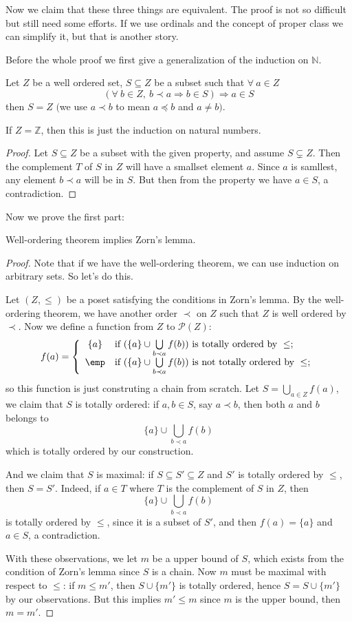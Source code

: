 Now we claim that these three things are equivalent. The proof is not so difficult but still need some efforts. If we use ordinals and the concept of proper class we can simplify it, but that is another story.\par
Before the whole proof we first give a generalization of the induction on $\mathbb{N}$.
\begin{theorem}
Let $Z$ be a well ordered set, $S\subseteq Z$ be a subset such that $\forall\ a\in Z$
\[(\forall\ b\in Z,\ b\prec a\Rightarrow b\in S)\Rightarrow a\in S\]
then $S=Z$ $($we use $a\prec b$ to mean $a\preceq b$ and $a\neq b$$)$.
\end{theorem}
If $Z=\mathbb{Z}$, then this is just the induction on natural numbers.
\begin{proof}
	Let $S\subseteq Z$ be a subset with the given property, and assume $S\subsetneq Z$. Then the complement $T$ of $S$ in $Z$ will have a smallset element $a$. Since $a$ is samllest, any element $b\prec a$ will be in $S$. But then from the property we have $a\in S$, a contradiction.
\end{proof}
Now we prove the first part:
\begin{theorem}
	Well-ordering theorem implies Zorn's lemma.
\end{theorem}
\begin{proof}
Note that if we have the well-ordering theorem, we can use induction on arbitrary sets. So let's do this.\par
Let $(Z,\leq)$ be a poset satisfying the conditions in Zorn's lemma. By the well-ordering theorem, we have another order $\prec$ on $Z$ such that $Z$ is well ordered by $\prec$. Now we define a function from $Z$ to $\mathscr{P}(Z)$:
\[f(a)=\left\{\begin{array}{cl}
\{a\} &\text{if }(\{a\}\cup \bigcup\limits_{b\prec a}f(b))\text{ is totally ordered by }\leq;\\
\emp  &\text{if }(\{a\}\cup \bigcup\limits_{b\prec a}f(b))\text{ is not totally ordered by }\leq;
\end{array}\right. \]
so this function is just construting a chain from scratch. Let $S=\bigcup_{a\in Z}f(a)$, we claim that $S$ is totally ordered: 
if $a,b\in S$, say $a\prec b$, then both $a$ and $b$ belongs to
\[\{a\}\cup \bigcup\limits_{b\prec a}f(b)\]
which is totally ordered by our construction.\par
And we claim that $S$ is maximal: if $S\subseteq S'\subseteq Z$ and $S'$ is totally ordered by $\leq$, then $S=S'$. Indeed, if $a\in T$ where $T$ is the complement of $S$ in $Z$, then 
\[\{a\}\cup \bigcup\limits_{b\prec a}f(b)\]
is totally ordered by $\leq$, since it is a subset of $S'$, and then $f(a)=\{a\}$ and $a\in S$, a contradiction.\par
With these observations, we let $m$ be a upper bound of $S$, which exists from the condition of Zorn's lemma since $S$ is a chain. Now $m$ must be maximal with respect to $\leq$: if $m\leq m'$, then $S\cup \{m'\}$ is totally ordered, hence $S=S\cup \{m'\}$ by our observations. But this implies $m'\leq m$ since $m$ is the upper bound, then $m=m'$.
\end{proof}
